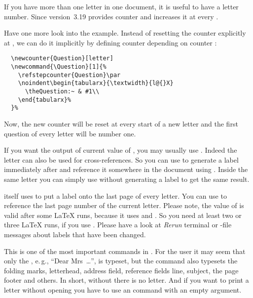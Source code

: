 \begin{Declaration}
\end{Declaration}
If you have more
than one letter in one document, it is useful to have a letter number. Since
version~3.19 \KOMAScript{} provides counter  and increases it
at every .
\begin{Example}
  Have one more look into the  example. Instead of
  resetting the counter explicitly at , we can
  do it implicitly by defining counter  depending on counter
  :
\begin{lstlisting}
  \newcounter{Question}[letter]
  \newcommand{\Question}[1]{%
    \refstepcounter{Question}\par
    \noindent\begin{tabularx}{\textwidth}{l@{}X}
      \theQuestion:~ & #1\\
    \end{tabularx}%
  }%
\end{lstlisting}
  Now, the new counter will be reset at every start of a new letter and
  the first question of every letter will be number one.
\end{Example}

If you want the output of current value of , you may usually
use . Indeed the letter can also be used for
cross-references. So you can use  to generate a
label immediately after  and reference it
somewhere in the document using . Inside the same
letter you can simply use  without generating a label to get
the same result.

\KOMAScript{} itself uses  to put a label onto the last page
of every letter. You can use
 to reference the last
page number of the current letter. Please note, the value of
 is valid after some \LaTeX{} runs, because it uses
 and . So you need at least two or three \LaTeX{}
runs, if you use . Please have a look at \emph{Rerun}
terminal or -file messages about labels that have been changed.%
\EndIndexGroup


\begin{Declaration}
\end{Declaration}
This is one of the most important commands in .  For the user
it may seem that only the , e.\,g.,
``Dear Mrs~\dots'', is typeset, but the command also
typesets the folding marks,
letterhead, address field, reference
fields line, subject, the page
footer and others. In short, without  there
is no letter. And if you want to print a letter without opening you have to
use an  command with an empty argument.

